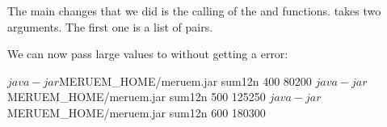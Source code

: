 The main changes that we did is the calling of the  and  functions.  takes two arguments. The first one is a list of pairs. 

We can now pass large values to  without getting a  error:

\begin{REPL}
$ java -jar $MERUEM_HOME/meruem.jar sum12n 400
80200
$ java -jar $MERUEM_HOME/meruem.jar sum12n 500
125250
$ java -jar $MERUEM_HOME/meruem.jar sum12n 600
180300
\end{REPL}